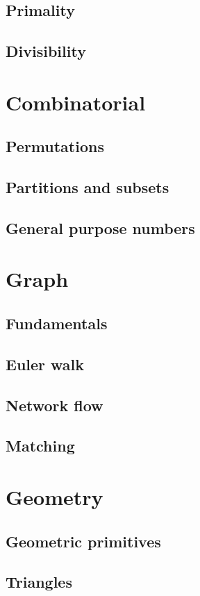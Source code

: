 \documentclass[10pt, a4paper, notitlepage]{report}
\begin{document}
\begin{multicols*}{3}
	\section{Primality}
	\section{Divisibility}
	
	\chapter{Combinatorial}
	\section{Permutations}
	\section{Partitions and subsets}
	\section{General purpose numbers}
	
	\chapter{Graph}
	\section{Fundamentals}
	\section{Euler walk}
	\section{Network flow}
	\section{Matching}
	
	\chapter{Geometry}
	\section{Geometric primitives}
	\section{Triangles}

\end{multicols*}
\end{document}
